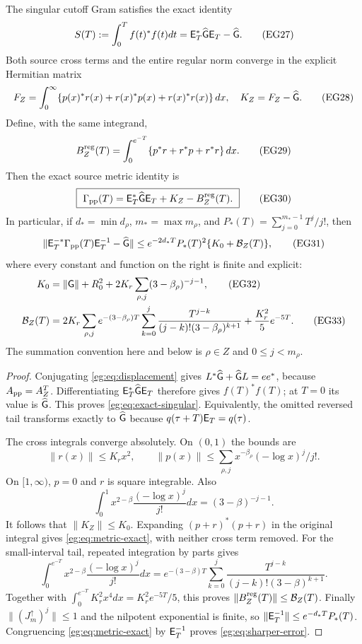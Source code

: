 \documentclass[11pt]{article}
\begin{document}
\begin{egtheorem}
\label{eg:thm:finite-correction}
The singular cutoff Gram satisfies the exact identity
\[
 S(T):=\int_0^T f(t)^*f(t)dt=\mathsf E_T^*\widehat{\mathsf G}\mathsf E_T-\widehat{\mathsf G}.
 \tag{EG27}\label{eg:eq:exact-singular}
\]
Both source cross terms and the entire regular norm converge in the
explicit Hermitian matrix
\[
 F_Z=\int_0^\infty\{p(x)^*r(x)+r(x)^*p(x)+r(x)^*r(x)\}\,dx,
 \quad K_Z=F_Z-\widehat{\mathsf G}.\tag{EG28}\label{eg:eq:finite-K}
\]
Define, with the same integrand,
\[
 B_Z^{\rm reg}(T)=\int_0^{e^{-T}}
                     \{p^*r+r^*p+r^*r\}\,dx.
 \tag{EG29}\label{eg:eq:regular-tail}
\]
Then the exact source metric identity is
\[
 \boxed{\ \Gamma_{\rm pp}(T)=
       \mathsf E_T^*\widehat{\mathsf G}\mathsf E_T+K_Z-B_Z^{\rm reg}(T).\ }
 \tag{EG30}\label{eg:eq:metric-exact}
\]
In particular, if $d_* =\min d_\rho$, $m_* =\max m_\rho$, and
$P_*(T)=\sum_{j=0}^{m_*-1}T^j/j!$, then
\[
 \|\mathsf E_T^{-*}\Gamma_{\rm pp}(T)\mathsf E_T^{-1}-\widehat{\mathsf G}\|
       \le e^{-2d_*T}P_*(T)^2\{K_0+\mathcal B_Z(T)\},
 \tag{EG31}\label{eg:eq:sharper-error}
\]
where every constant and function on the right is finite and explicit:
\begin{align}
 K_0&=\|\mathsf G\|+R_0^2+
                2K_r\sum_{\rho,j}(3-\beta_\rho)^{-j-1},\tag{EG32}\label{eg:eq:K0}\\
 \mathcal B_Z(T)&=2K_r\sum_{\rho,j}e^{-(3-\beta_\rho)T}
   \sum_{k=0}^j\frac{T^{j-k}}{(j-k)!(3-\beta_\rho)^{k+1}}
                       +\frac{K_r^2}5e^{-5T}.\tag{EG33}\label{eg:eq:B-bound}
\end{align}
The summation convention here and below is $\rho\in Z$ and
$0\le j<m_\rho$.
\end{egtheorem}
\begin{proof}
Conjugating \eqref{eg:eq:displacement} gives
$L^*\widehat{\mathsf G}+\widehat{\mathsf G} L=ee^*$, because
$A_{\rm pp}=A_Z^T$. Differentiating
$\mathsf E_T^*\widehat{\mathsf G}\mathsf E_T$ therefore gives $f(T)^*f(T)$; at $T=0$
its value is $\widehat{\mathsf G}$. This proves \eqref{eg:eq:exact-singular}.
Equivalently, the omitted reversed tail transforms exactly to
$\widehat{\mathsf G}$ because $q(\tau+T)\mathsf E_T=q(\tau)$.

The cross integrals converge absolutely. On $(0,1)$ the bounds are
\[
 \|r(x)\|\le K_rx^2,\qquad
 \|p(x)\|\le\sum_{\rho,j}x^{-\beta_\rho}(-\log x)^j/j!.
\]
On $[1,\infty)$, $p=0$ and $r$ is square integrable. Also
\[
 \int_0^1x^{2-\beta}\frac{(-\log x)^j}{j!}dx
                         =(3-\beta)^{-j-1}.
\]
It follows that $\|K_Z\|\le K_0$. Expanding
$(p+r)^*(p+r)$ in the original integral gives
\eqref{eg:eq:metric-exact}, with neither cross term removed.
For the small-interval tail, repeated integration by parts gives
\[
 \int_0^{e^{-T}}x^{2-\beta}\frac{(-\log x)^j}{j!}dx
 =e^{-(3-\beta)T}\sum_{k=0}^j
                    \frac{T^{j-k}}{(j-k)!(3-\beta)^{k+1}}.
\]
Together with $\int_0^{e^{-T}}K_r^2x^4dx=K_r^2e^{-5T}/5$, this
proves $\|B_Z^{\rm reg}(T)\|\le\mathcal B_Z(T)$.
Finally $\|(J_m^\uparrow)^j\|\le1$ and the nilpotent exponential
is finite, so $\|\mathsf E_T^{-1}\|\le e^{-d_*T}P_*(T)$.
Congruencing \eqref{eg:eq:metric-exact} by $\mathsf E_T^{-1}$ proves
\eqref{eg:eq:sharper-error}.
\end{proof}
\end{document}
